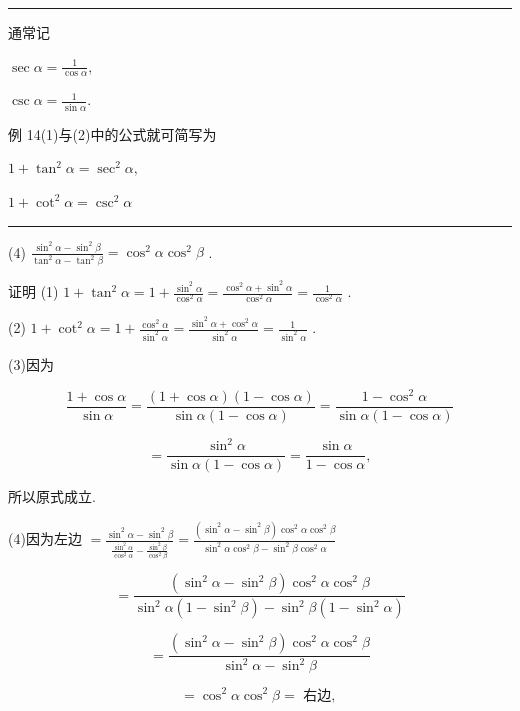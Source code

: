 \documentclass[10pt]{article}
\newcommand{\HRule}{\begin{center}\rule{0.9\linewidth}{0.2mm}\end{center}}
\begin{document}
\HRule

通常记

\(\sec \alpha  = \frac{1}{\cos \alpha },\)

\(\csc \alpha  = \frac{1}{\sin \alpha }.\)

例 14(1)与(2)中的公式就可简写为

\(1 + {\tan }^{2}\alpha  = {\sec }^{2}\alpha ,\)

\(1 + {\cot }^{2}\alpha  = {\csc }^{2}\alpha\)

\HRule

(4) \(\frac{{\sin }^{2}\alpha  - {\sin }^{2}\beta }{{\tan }^{2}\alpha  - {\tan }^{2}\beta } = {\cos }^{2}\alpha {\cos }^{2}\beta\) .

证明 (1) \(1 + {\tan }^{2}\alpha  = 1 + \frac{{\sin }^{2}\alpha }{{\cos }^{2}\alpha } = \frac{{\cos }^{2}\alpha  + {\sin }^{2}\alpha }{{\cos }^{2}\alpha } = \frac{1}{{\cos }^{2}\alpha }\) .

(2) \(1 + {\cot }^{2}\alpha  = 1 + \frac{{\cos }^{2}\alpha }{{\sin }^{2}\alpha } = \frac{{\sin }^{2}\alpha  + {\cos }^{2}\alpha }{{\sin }^{2}\alpha } = \frac{1}{{\sin }^{2}\alpha }\) .

(3)因为

\[
\frac{1 + \cos \alpha }{\sin \alpha } = \frac{\left( {1 + \cos \alpha }\right) \left( {1 - \cos \alpha }\right) }{\sin \alpha \left( {1 - \cos \alpha }\right) } = \frac{1 - {\cos }^{2}\alpha }{\sin \alpha \left( {1 - \cos \alpha }\right) }
\]

\[
= \frac{{\sin }^{2}\alpha }{\sin \alpha \left( {1 - \cos \alpha }\right) } = \frac{\sin \alpha }{1 - \cos \alpha },
\]

所以原式成立.

(4)因为左边 \(= \frac{{\sin }^{2}\alpha  - {\sin }^{2}\beta }{\frac{{\sin }^{2}\alpha }{{\cos }^{2}\alpha } - \frac{{\sin }^{2}\beta }{{\cos }^{2}\beta }} = \frac{\left( {{\sin }^{2}\alpha  - {\sin }^{2}\beta }\right) {\cos }^{2}\alpha {\cos }^{2}\beta }{{\sin }^{2}\alpha {\cos }^{2}\beta  - {\sin }^{2}\beta {\cos }^{2}\alpha }\)

\[
= \frac{\left( {{\sin }^{2}\alpha  - {\sin }^{2}\beta }\right) {\cos }^{2}\alpha {\cos }^{2}\beta }{{\sin }^{2}\alpha \left( {1 - {\sin }^{2}\beta }\right)  - {\sin }^{2}\beta \left( {1 - {\sin }^{2}\alpha }\right) }
\]

\[
= \frac{\left( {{\sin }^{2}\alpha  - {\sin }^{2}\beta }\right) {\cos }^{2}\alpha {\cos }^{2}\beta }{{\sin }^{2}\alpha  - {\sin }^{2}\beta }
\]

\[
= {\cos }^{2}\alpha {\cos }^{2}\beta  = \text{ 右边, }
\]
\end{document}
